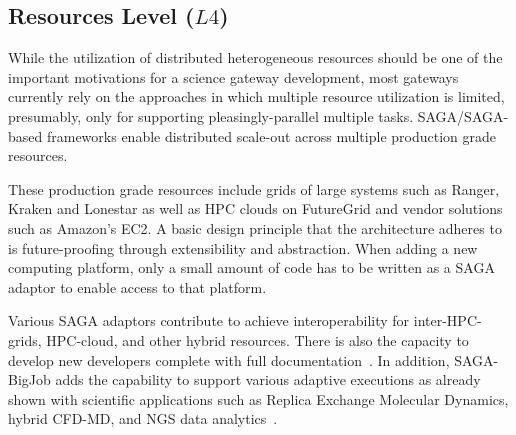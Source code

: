 \documentclass[]{svjour3}
\begin{document}





\subsection{Resources Level ($L4$)} 

While the utilization of distributed heterogeneous resources should be
one of the important motivations for a science gateway development,
most gateways currently rely on the approaches in which multiple
resource utilization is limited, presumably, only for supporting
pleasingly-parallel multiple tasks.  SAGA/SAGA-based frameworks enable
distributed scale-out across multiple production grade resources.

These production grade resources include grids of large systems such
as Ranger, Kraken and Lonestar as well as HPC clouds on FutureGrid and
vendor solutions such as Amazon's EC2. A basic design principle that
the architecture adheres to is future-proofing through extensibility
and abstraction. When adding a new computing platform, only a small
amount of code has to be written as a SAGA adaptor to enable access to
that platform.

Various SAGA adaptors contribute to achieve interoperability for
inter-HPC-grids, HPC-cloud, and other hybrid resources. There is also
the capacity to develop new developers complete with full
documentation~\cite{saga_url}.  In addition, SAGA-BigJob adds the
capability to support various adaptive executions as already shown
with scientific applications such as Replica Exchange Molecular
Dynamics, hybrid CFD-MD, and NGS data
analytics~\cite{saga-royalsoc,coupled,ecmls11}.
\end{document}

